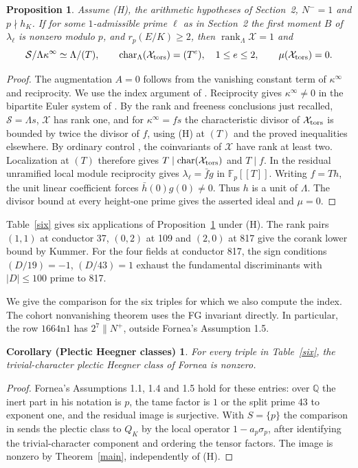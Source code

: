\documentclass[11pt]{article}
\newtheorem{proposition}[theorem]{Proposition}
\newtheorem*{plectic}{Corollary (Plectic Heegner classes)}
\newcommand{\Q}{\mathbb Q}
\newcommand{\F}{\mathbb F}
\begin{document}
\begin{proposition}\label{index}
Assume (H), the arithmetic hypotheses of Section~2, $N^-=1$ and $p\nmid h_K$. If for some $1$-admissible prime $\ell$ as in Section~2 the first moment $B$ of $\lambda_\ell$ is nonzero modulo $p$, and $r_p(E/K)\ge2$, then $\operatorname{rank}_\Lambda\mathcal X=1$ and
\[
 \mathcal S/\Lambda\kappa^\infty\simeq\Lambda/(T),\qquad
 \operatorname{char}_\Lambda(\mathcal X_{\rm tors})=(T^e),
 \quad 1\le e\le2,\qquad \mu(\mathcal X_{\rm tors})=0.
\]
\end{proposition}
\begin{proof}
The augmentation $A=0$ follows from the vanishing constant term of $\kappa^\infty$ \cite[Lemma 3.12]{FG} and reciprocity. We use the index argument of \cite[\S6, $h=1$]{current}. Reciprocity gives $\kappa^\infty\ne0$ in the bipartite Euler system of \cite[Corollary 3.17]{FG}. By the rank and freeness conclusions just recalled, $\mathcal S=\Lambda s$, $\mathcal X$ has rank one, and for $\kappa^\infty=fs$ the characteristic divisor of $\mathcal X_{\rm tors}$ is bounded by twice the divisor of $f$, using (H) at $(T)$ and the proved inequalities elsewhere. By ordinary control \cite[Lemma 3.1]{FG}, the coinvariants of $\mathcal X$ have rank at least two. Localization at $(T)$ therefore gives $T\mid\operatorname{char}(\mathcal X_{\rm tors})$ and $T\mid f$. In the residual unramified local module reciprocity gives $\lambda_\ell=\bar f g$ in $\F_p[[T]]$. Writing $f=Th$, the unit linear coefficient forces $\bar h(0)g(0)\ne0$. Thus $h$ is a unit of $\Lambda$. The divisor bound at every height-one prime gives the asserted ideal and $\mu=0$.

\end{proof}

Table~\ref{six} gives six applications of Proposition~\ref{index} under (H). The rank pairs $(1,1)$ at conductor 37, $(0,2)$ at 109 and $(2,0)$ at 817 give the corank lower bound by Kummer. For the four fields at conductor 817, the sign conditions $(D/19)=-1$, $(D/43)=1$ exhaust the fundamental discriminants with $|D|\le100$ prime to 817.

We give the comparison for the six triples for which we also compute the index. The cohort nonvanishing theorem uses the FG invariant directly. In particular, the row $1664\mathrm n1$ has $2^7\parallel N^+$, outside Fornea's Assumption 1.5.
\begin{plectic}
For every triple in Table~\ref{six}, the trivial-character plectic Heegner class of Fornea is nonzero.
\end{plectic}
\begin{proof}
Fornea's Assumptions 1.1, 1.4 and 1.5 hold for these entries: over $\Q$ the inert part in his notation is $p$, the tame factor is $1$ or the split prime 43 to exponent one, and the residual image is surjective. With $S=\{p\}$ the comparison in \cite[Theorem B]{F} sends the plectic class to $Q_K$ by the local operator $1-a_p\sigma_p$, after identifying the trivial-character component and ordering the tensor factors. The image is nonzero by Theorem~\ref{main}, independently of (H).
\end{proof}
\end{document}
